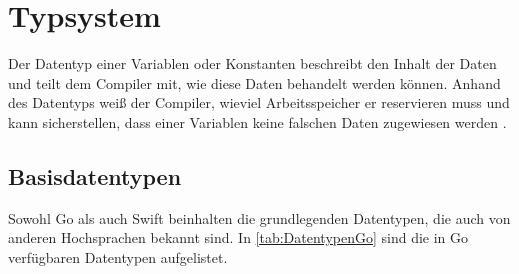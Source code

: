 \chapter{Typsystem}
\label{ch:Typsystem}
Der Datentyp einer Variablen oder Konstanten beschreibt den Inhalt der Daten und teilt dem Compiler mit, wie diese Daten behandelt werden können. 
Anhand des Datentyps weiß der Compiler, wieviel Arbeitsspeicher er reservieren muss und kann sicherstellen, dass einer Variablen keine falschen Daten zugewiesen werden \cite[S.62]{Mathias.2016}.

\section{Basisdatentypen}
Sowohl Go als auch Swift beinhalten die grundlegenden Datentypen, die auch von anderen Hochsprachen bekannt sind.
In \autoref{tab:DatentypenGo} sind die in Go verfügbaren Datentypen aufgelistet.

